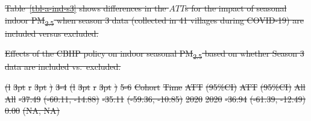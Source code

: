 \documentclass[
  letterpaper,
  DIV=11,
  numbers=noendperiod]{scrartcl}
\makeatletter
\renewenvironment{table}%
   {\renewcommand\familydefault\sfdefault
    \@float{table}}
   {\end@float}
\providecommand{\DIFdeltex}[1]{{\protect\color{red}\sout{#1}}}                      %
\providecommand{\DIFdelFL}[1]{\DIFdel{#1}} %
\providecommand{\DIFdel}[1]{\texorpdfstring{\DIFdeltex{#1}}{}} %
\makeatother
\begin{document}
\DIFdel{Table~\ref{tbl-a-ind-s3} shows differences in the \(ATT\)s for the
impact of seasonal indoor PM\textsubscript{2.5} when season 3 data
(collected in 41 villages during COVID-19) are included versus excluded.
}%

{%
\DIFdelFL{Effects of the CBHP policy on indoor seasonal PM\textsubscript{2.5}
based on whether Season 3 data are included vs.~excluded. }}%

\DIFdelFL{(l}%
\DIFdelFL{3pt}%
\DIFdelFL{r}%
\DIFdelFL{3pt}%
\DIFdelFL{)}%
\DIFdelFL{3-4}%
\DIFdelFL{(l}%
\DIFdelFL{3pt}%
\DIFdelFL{r}%
\DIFdelFL{3pt}%
\DIFdelFL{)}%
\DIFdelFL{5-6}%
\DIFdelFL{Cohort }%
\DIFdelFL{Time }%
\DIFdelFL{ATT }%
\DIFdelFL{(95\%CI) }%
\DIFdelFL{ATT }%
\DIFdelFL{(95\%CI)}%
\DIFdelFL{All }%
\DIFdelFL{All }%
\DIFdelFL{-37.49 }%
\DIFdelFL{(-60.11, -14.88) }%
\DIFdelFL{-35.11 }%
\DIFdelFL{(-59.36, -10.85)}%
\DIFdelFL{2020 }%
\DIFdelFL{2020 }%
\DIFdelFL{-36.94 }%
\DIFdelFL{(-61.39, -12.49) }%
\DIFdelFL{0.00 }%
\DIFdelFL{(NA, NA)}%
\end{document}
